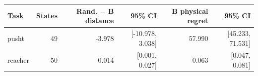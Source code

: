 \begin{tabular}{lrrrrr}
\toprule
Task & States & Rand. $-$ B distance & 95\% CI & B physical regret & 95\% CI \\
\midrule
pusht & 49 & -3.978 & [-10.978, 3.038] & 57.990 & [45.233, 71.531] \\
reacher & 50 & 0.014 & [0.001, 0.027] & 0.063 & [0.047, 0.081] \\
\bottomrule
\end{tabular}
